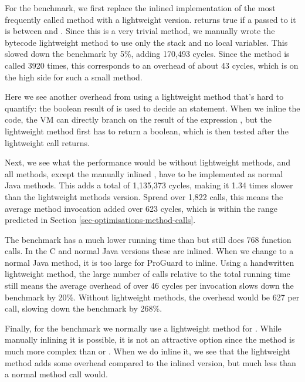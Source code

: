 For the benchmark, we first replace the inlined implementation of the most frequently called method with a lightweight version.  returns true if a  passed to it is between  and . Since this is a very trivial method, we manually wrote the bytecode lightweight method to use only the stack and no local variables. This slowed down the benchmark by 5\%, adding 170,493 cycles. Since the method is called 3920 times, this corresponds to an overhead of about 43 cycles, which is on the high side for such a small method.

Here we see another overhead from using a lightweight method that's hard to quantify: the boolean result of  is used to decide an  statement. When we inline the code, the VM can directly branch on the result of the expression , but the lightweight method first has to return a boolean, which is then tested after the lightweight call returns.

Next, we see what the performance would be without lightweight methods, and all methods, except the manually inlined , have to be implemented as normal Java methods. This adds a total of 1,135,373 cycles, making it 1.34 times slower than the lightweight methods version. Spread over 1,822 calls, this means the average method invocation added over 623 cycles, which is within the range predicted in Section \ref{sec-optimisations-method-calls}.

The  benchmark has a much lower running time than  but still does 768 function calls. In the C and normal Java versions these are inlined. When we change  to a normal Java method, it is too large for ProGuard to inline. Using a handwritten lightweight method, the large number of calls relative to the total running time still means the average overhead of over 46 cycles per invocation slows down the benchmark by 20\%. Without lightweight methods, the overhead would be 627 per call, slowing down the benchmark by 268\%.

Finally, for the  benchmark we normally use a lightweight method for . While manually inlining it is possible, it is not an attractive option since the  method is much more complex than  or . When we do inline it, we see that the lightweight method adds some overhead compared to the inlined version, but much less than a normal method call would.

